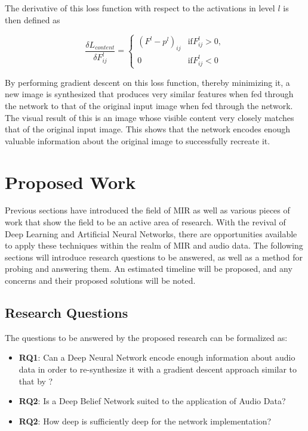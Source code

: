 \documentclass[12pt]{article}
\begin{document}
The derivative of this loss function with respect to the activations in level $l$ is then defined as

\[
\frac{\delta L_{content}}{\delta F^{l}_{ij}} = 
\begin{cases}
(F^l - p^l)_{ij} & \text{if}  F^{l}_{ij} > 0, \\
0 & \text{if} F^{l}_{ij} < 0
\end{cases}
\]

By performing gradient descent on this loss function, thereby minimizing it, a new image is synthesized that produces very similar features when fed through the network to that of the original input image when fed through the network. The visual result of this is an image whose visible content very closely matches that of the original input image. This shows that the network encodes enough valuable information about the original image to successfully recreate it.  


\section{Proposed Work}

Previous sections have introduced the field of MIR as well as various pieces of work that show the field to be an active area of research. With the revival of Deep Learning and Artificial Neural Networks, there are opportunities available to apply these techniques within the realm of MIR and audio data. The following sections will introduce research questions to be answered, as well as a method for probing and answering them. An estimated timeline will be proposed, and any concerns and their proposed solutions will be noted.

\subsection{Research Questions}
The questions to be answered by the proposed research can be formalized as:

\begin{itemize}
\item \textbf{RQ1}: Can a Deep Neural Network encode enough information about audio data in order to re-synthesize it with a gradient descent approach similar to that by \citet{gatys2015neural}?
\item \textbf{RQ2}: Is a Deep Belief Network suited to the application of Audio Data?
\item \textbf{RQ2}: How deep is sufficiently deep for the network implementation?
\end{itemize}
\end{document}
